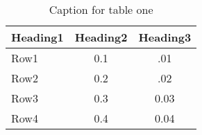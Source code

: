 \begin{table}[H]
\centering
\caption{Caption for table one}
\label{tab:table1}
\begin{tabular}{@{}lcc@{}}
\toprule
\textbf{Heading1} & \textbf{Heading2} & \textbf{Heading3} \\ \midrule
Row1 & 0.1 & .01 \\
Row2 & 0.2 & .02 \\
Row3 & 0.3 & 0.03 \\
Row4 & 0.4 & 0.04 \\ \bottomrule
\end{tabular}
\end{table}